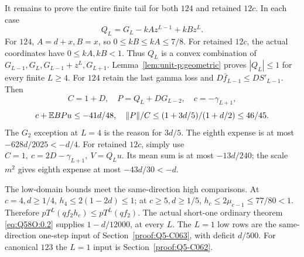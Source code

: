 It remains to prove the entire finite tail for both \(124\)
and retained \(12c\).
In each case
\[
 Q_L=G_L-kAz^{L-1}+kBz^L .
\]
For \(124\), \(A=d+x,B=x\), so \(0\le kB\le kA\le7/8\).
For retained \(12c\), the actual coordinates have
\(0\le kA,kB<1\).
Thus \(Q_L\) is a convex combination of
\(G_{L-1},G_L,G_{L-1}+z^L,G_{L+1}\).
Lemma~\ref{lem:unit-p:geometric} proves \(|Q_L|\le1\)
for every finite \(L\ge4\).
For \(124\) retain the last gamma loss and
\(D\bar f_{L-1}\le DS'_{L-1}\). Then
\[
 C=1+D,\quad P=Q_L+DG_{L-2},\quad c=-\gamma_{L+1},
\]
\[
 c+\mathbb E BPu\le-41d/48,\quad
 \|P\|/C\le(1+3d/5)/(1+d/2)\le46/45 .
\]
The \(G_2\) exception at \(L=4\) is the reason for \(3d/5\).
The eighth expense is at most \(-628d/2025<-d/4\).
For retained \(12c\), simply use
\(C=1,\ c=2D-\gamma_{L+1},\ V=Q_Lu\).
Its mean sum is at most \(-13d/240\); the scale \(m^2\)
gives eighth expense at most \(-43d/30<-d\).

The low-domain bounds meet the same-direction high comparisons.
At \(c=4,d\ge1/4\), \(h_4\le2(1-2d)\le1\);
at \(c\ge5,d\ge1/5\), \(h_c\le2\mu_{c-1}\le77/80<1\).
Therefore \(pT^L(qf_2h_c)\le pT^L(qf_2)\).
The actual short-one ordinary theorem
\eqref{eq:Q58O:0.2} supplies \(1-d/12000\), at every \(L\).
The \(L=1\) low rows are the same-direction one-step input
of Section~\ref{proof:Q5-C063}, with deficit \(d/500\).
For canonical \(123\) the \(L=1\) input is
Section~\ref{proof:Q5-C062}.

